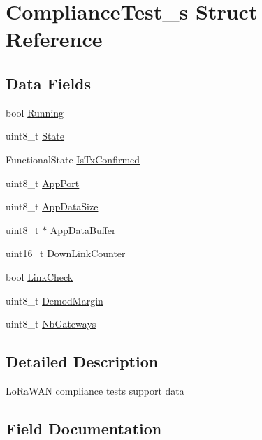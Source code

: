 \hypertarget{structComplianceTest__s}{}\section{Compliance\+Test\+\_\+s Struct Reference}
\label{structComplianceTest__s}
\subsection*{Data Fields}
\begin{DoxyCompactItemize}
\item 
bool \hyperlink{structComplianceTest__s_a9fe440a17751188399bfcea77e1e16bf}{Running}
\item 
uint8\+\_\+t \hyperlink{structComplianceTest__s_a09f13d5e6c7f74b686f798421631942f}{State}
\item 
Functional\+State \hyperlink{structComplianceTest__s_adfa84b8a00789461a9d200c34025958f}{Is\+Tx\+Confirmed}
\item 
uint8\+\_\+t \hyperlink{structComplianceTest__s_a5d5a6c64e1a230836b3c20ab10526ad9}{App\+Port}
\item 
uint8\+\_\+t \hyperlink{structComplianceTest__s_aee38d06c8b326209d9f316815698d396}{App\+Data\+Size}
\item 
uint8\+\_\+t $\ast$ \hyperlink{structComplianceTest__s_a7aeb423dcc1989e14b476b7abba60385}{App\+Data\+Buffer}
\item 
uint16\+\_\+t \hyperlink{structComplianceTest__s_aa3eeaf5d3061e15ec3835dbc9ece4683}{Down\+Link\+Counter}
\item 
bool \hyperlink{structComplianceTest__s_abcd594cefd9fb669dbb97d86213fcf44}{Link\+Check}
\item 
uint8\+\_\+t \hyperlink{structComplianceTest__s_a14edd4e6871944ff733fd8a14133d899}{Demod\+Margin}
\item 
uint8\+\_\+t \hyperlink{structComplianceTest__s_a5896f8dcc61f8e45b30a0d8de8b8bd54}{Nb\+Gateways}
\end{DoxyCompactItemize}


\subsection{Detailed Description}
Lo\+Ra\+W\+AN compliance tests support data 

\subsection{Field Documentation}
\mbox{\label{structComplianceTest__s_a7aeb423dcc1989e14b476b7abba60385}} 
